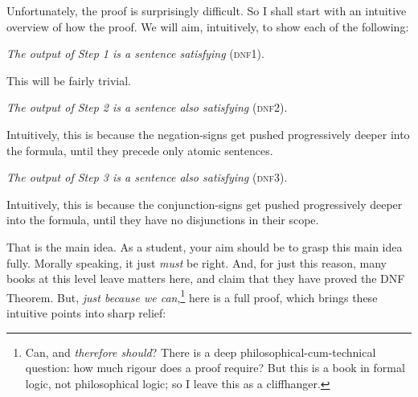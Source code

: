 Unfortunately, the proof is surprisingly difficult. So I shall start with an intuitive overview of how the proof. We will aim, intuitively, to show each of the following:
\begin{ebullet}	
	\item \emph{The output of Step 1 is a sentence satisfying} (\textsc{dnf1}).

	This will be fairly trivial.
	
	\item \emph{The output of Step 2 is a sentence also satisfying} (\textsc{dnf2}). 
	
	Intuitively, this is because the negation-signs get pushed progressively deeper into the formula, until they precede only atomic sentences.
	
	\item \emph{The output of Step 3 is a sentence also satisfying} (\textsc{dnf3}).
	
	Intuitively, this is because the conjunction-signs get pushed progressively deeper into the formula, until they have no disjunctions in their scope.
\end{ebullet}
That is the main idea. As a student, your aim should be to grasp this main idea fully. Morally speaking, it just \emph{must} be right. And, for just this reason, many books at this level leave matters here, and claim that they have proved the DNF Theorem. But, \emph{just because we can},\footnote{Can, and \emph{therefore should}? There is a deep philosophical-cum-technical question: how much rigour does a proof require? But this is a book in formal logic, not philosophical logic; so I leave this as a cliffhanger.} here is a full proof, which brings these intuitive points into sharp relief:
